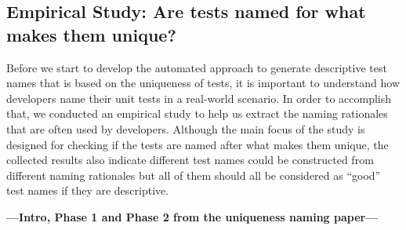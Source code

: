 \subsection{Empirical Study: Are tests named for what makes them unique?}
\label{sec:empStudy}

Before we start to develop the automated approach to generate descriptive test names that is based on the uniqueness of tests, it is important to understand how developers name their unit tests in a real-world scenario.
%
In order to accomplish that, we conducted an empirical study to help us extract the naming rationales that are often used by developers.
%
Although the main focus of the study is designed for checking if the tests are named after what makes them unique, the collected results also indicate different test names could be constructed from different naming rationales but all of them should all be considered as \enquote{good} test names if they are descriptive.

\textbf{---Intro, Phase 1 and Phase 2 from the uniqueness naming paper---}



